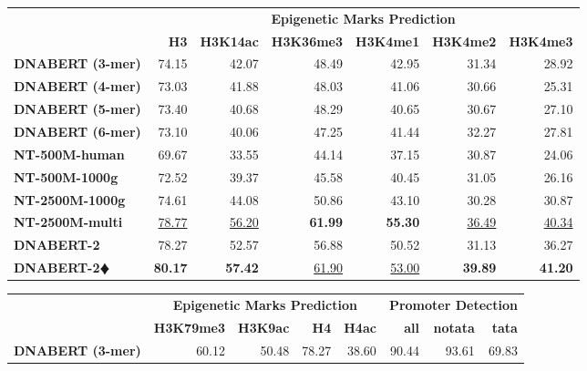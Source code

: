 \documentclass{article}
\begin{document}
\begin{table}[H]
	\centering
	\footnotesize
	\begin{tabular}{lrrrrrr}
		\toprule
        	& \multicolumn{6}{c}{\textbf{Epigenetic Marks Prediction}} \\
		\cmidrule(lr){2-7}
		& \textbf{ H3 } & \textbf{ H3K14ac } & \textbf{ H3K36me3 } & \textbf{ H3K4me1 } & \textbf{ H3K4me2 } & \textbf{ H3K4me3 } \\
		\midrule
		{\textbf{DNABERT (3-mer)} } & 74.15 & 42.07 & 48.49 & 42.95 & 31.34 & 28.92 \\
		
		{\textbf{DNABERT (4-mer)} } & 73.03 & 41.88 & 48.03 & 41.06 & 30.66 & 25.31 \\

            {\textbf{DNABERT (5-mer)} } & 73.40 & 40.68 & 48.29 & 40.65 & 30.67 & 27.10  \\

            {\textbf{DNABERT (6-mer) } } &  73.10 & 40.06 & 47.25 & 41.44 & 32.27 & 27.81  \\
            
            {\textbf{NT-500M-human} } & 69.67 & 33.55 & 44.14 & 37.15 & 30.87 & 24.06 \\

            {\textbf{NT-500M-1000g} } & 72.52 & 39.37 & 45.58 & 40.45 & 31.05 & 26.16 \\

            {\textbf{NT-2500M-1000g} } & 74.61 & 44.08 & 50.86 & 43.10 & 30.28 & 30.87 \\

            {\textbf{NT-2500M-multi} } & \underline{78.77} & \underline{56.20} & \textbf{61.99} & \textbf{55.30} & \underline{36.49} & \underline{40.34} \\

		
		\midrule

            {\textbf{DNABERT-2} } & 78.27 & 52.57 & 56.88 & 50.52 & 31.13 & 36.27 \\

            {\textbf{DNABERT-2$\vardiamondsuit$} } &  \textbf{80.17} & \textbf{57.42} & \underline{61.90} & \underline{53.00} & \textbf{39.89} & \textbf{41.20}  \\
		\bottomrule
	\end{tabular}

	\begin{tabular}{lrrrrrrr}
		\toprule
  & \multicolumn{4}{c}{\textbf{Epigenetic Marks Prediction}} & \multicolumn{3}{c}{\textbf{Promoter Detection}} \\
		\cmidrule(lr){2-5}  \cmidrule(lr){6-8}
		& \textbf{ H3K79me3 } & \textbf{ H3K9ac } & \textbf{ H4 } & \textbf{ H4ac } & \textbf{all} & \textbf{notata} & \textbf{tata} \\
		\midrule
		{\textbf{DNABERT (3-mer)} } &  60.12 & 50.48 & 78.27 & 38.60 &90.44 & 93.61 & 69.83 \\
		

\end{tabular}
\end{table}
\end{document}
